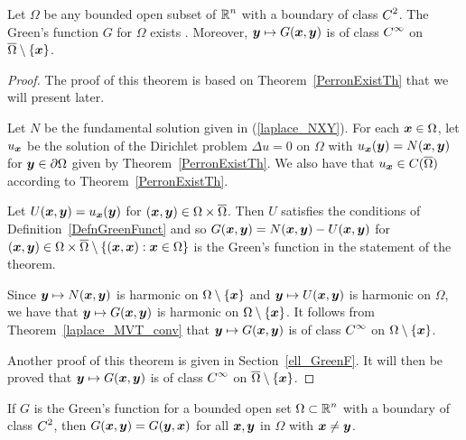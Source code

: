\begin{theorem} \label{laplace_GreenExist}
Let $\Omega$ be any bounded open subset of $\displaystyle \mathbb{R}^n$ with
a boundary of class $\displaystyle C^2$.  The Green's function $G$ for
$\Omega$ exists \footnotemark.  Moreover,
${\bm{y}} \mapsto G({\bm{x}},{\bm{y}})$ is of class
$\displaystyle C^\infty$ on $\overline{\Omega} \setminus \{{\bm{x}}\}$.
\end{theorem}


\begin{proof}
The proof of this theorem is based on Theorem~\ref{PerronExistTh} that
we will present later.
  
Let $N$ be the fundamental solution given in (\ref{laplace_NXY}).
For each ${\bm{x}} \in \Omega$, let $u_{{\bm{x}}}$ be the
solution of the Dirichlet problem $\Delta u = 0$ on $\Omega$ with
$u_{{\bm{x}}}({\bm{y}}) = N({\bm{x}},{\bm{y}})$ for ${\bm{y}} \in \partial \Omega$
given by Theorem~\ref{PerronExistTh}.  We also have that
$\displaystyle u_{{\bm{x}}} \in C(\overline{\Omega})$
according to Theorem~\ref{PerronExistTh}.

Let $U({\bm{x}},{\bm{y}}) = u_{{\bm{x}}}({\bm{y}})$ for
$({\bm{x}},{\bm{y}}) \in \Omega \times \overline{\Omega}$.  Then
$U$ satisfies the conditions of Definition~\ref{DefnGreenFunct} and so
$G({\bm{x}},{\bm{y}}) = N({\bm{x}},{\bm{y}}) - U({\bm{x}},{\bm{y}})$
for $({\bm{x}},{\bm{y}}) \in \Omega \times \overline{\Omega}
\setminus \{ ({\bm{x}},{\bm{x}}) : {\bm{x}} \in \Omega \}$
is the Green's function in the statement of the theorem.

Since ${\bm{y}} \mapsto N({\bm{x}},{\bm{y}})$ is harmonic on
$\Omega \setminus \{{\bm{x}}\}$ and
${\bm{y}} \mapsto U({\bm{x}},{\bm{y}})$ is harmonic on $\Omega$, we have
that ${\bm{y}} \mapsto G({\bm{x}},{\bm{y}})$ is harmonic on 
$\Omega \setminus \{{\bm{x}}\}$.  It follows from
Theorem~\ref{laplace_MVT_conv} that ${\bm{y}} \mapsto G({\bm{x}},{\bm{y}})$
is of class $\displaystyle C^\infty$ on $\Omega \setminus \{{\bm{x}}\}$.

Another proof of this theorem is given in Section~\ref{ell_GreenF}.
It will then be proved that ${\bm{y}} \mapsto G({\bm{x}},{\bm{y}})$ is of class
$\displaystyle C^\infty$ on $\overline{\Omega} \setminus \{{\bm{x}}\}$.
\end{proof}

\begin{prop} \label{GxyGyx}
If $G$ is the Green's function for a bounded open set
$\displaystyle \Omega \subset \mathbb{R}^n$
with a boundary of class $\displaystyle C^2$, then
$G({\bm{x}},{\bm{y}}) = G({\bm{y}},{\bm{x}})$
for all ${\bm{x}},{\bm{y}}$ in $\Omega$ with ${\bm{x}}\neq {\bm{y}}$.
\end{prop}

